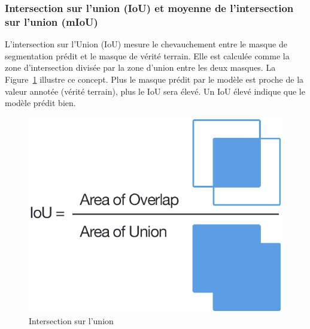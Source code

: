 \subsubsection{Intersection sur l'union (IoU) et moyenne de l'intersection sur l'union (mIoU)}

L'intersection sur l'Union (IoU) mesure le chevauchement entre le masque de segmentation prédit et le masque de vérité terrain. Elle est calculée comme la zone d'intersection divisée par la zone d'union entre les deux masques. La Figure~\ref{fig:A1_31_iou_concept} illustre ce concept. Plus le masque prédit par le modèle est proche de la valeur annotée (vérité terrain), plus le IoU sera élevé. Un IoU élevé indique que le modèle prédit bien.

\begin{figure}[H]
    \centering
    \includegraphics[width=0.50\linewidth]{03-tail//A1_fondamentaux_ML//A1_figures/A1_31_iou_concept.png}
    \caption{Intersection sur l’union \cite{rosebrock_intersection_2016}}
    \label{fig:A1_31_iou_concept}
\end{figure}

